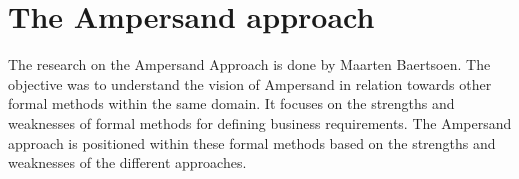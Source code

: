 

\section{The Ampersand approach}
\label{domain:approach}
The research on the Ampersand Approach is done by Maarten Baertsoen.
The objective was to understand the vision of Ampersand in relation towards other formal methods within the same domain.
It focuses on the strengths and weaknesses of formal methods for defining business requirements.
The Ampersand approach is positioned within these formal methods based on the strengths and weaknesses of the different approaches. 




